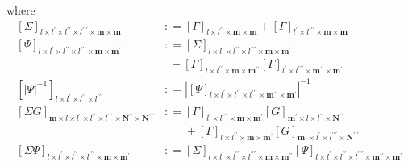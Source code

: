 \documentclass[preprint,12pt]{elsarticle}
\newcommand*{\M}[1]{\ensuremath{#1}\xspace}
\newcommand*{\x}{\times}
\newcommand*{\mi}[1]{\mathbf{#1}}
\newcommand*{\te}[2][]{\left\lbrack{#2}\right\rbrack_{#1}}
\newcommand*{\deq}{\M{\mathrel{\mathop:}=}}
\newcommand*{\modulus}[1]{\M{\left\lvert{#1}\right\rvert}}
\begin{document}
            where
            \begin{equation*}
                \begin{aligned}
                    \te[l\x l^{\prime}\x l^{\prime\prime}\x l^{\prime\prime\prime}\x\mi{m}\x\mi{m}]{\Sigma} &\deq 
                    \te[l\x l^{\prime\prime}\x\mi{m}\x\mi{m}]{\Gamma} + \te[l^{\prime}\x l^{\prime\prime\prime}\x\mi{m}\x\mi{m}]{\Gamma} \\
                    \te[l\x l^{\prime}\x l^{\prime\prime}\x l^{\prime\prime\prime}\x\mi{m}\x\mi{m^{\prime}}]{\Psi} &\deq 
                    \te[l\x l^{\prime}\x l^{\prime\prime}\x l^{\prime\prime\prime}\x\mi{m}\x\mi{m^{\prime}}]{\Sigma} \\
                    &\phantom{:}- \te[l\x l^{\prime\prime}\x\mi{m}\x\mi{m^{\prime\prime}}]{\Gamma} \te[l^{\prime}\x l^{\prime\prime\prime}\x\mi{m^{\prime\prime}}\x\mi{m^{\prime}}]{\Gamma} \\
                    \te[l\x l^{\prime}\x l^{\prime\prime}\x l^{\prime\prime\prime}]{\modulus{\Psi}^{-1}} &\deq 
                    \modulus{\te[l\x l^{\prime}\x l^{\prime\prime}\x l^{\prime\prime\prime}\x\mi{m^{\prime\prime}}\x\mi{m^{\prime}}]{\Psi}}^{-1} \\
                    \te[\mi{m}\x l\x l^{\prime}\x l^{\prime\prime}\x l^{\prime\prime\prime}\x\mi{N^{\prime\prime}}\x\mi{N^{\prime\prime\prime}}]{\Sigma G} &\deq 
                    \te[l^{\prime}\x l^{\prime\prime\prime}\x\mi{m}\x\mi{m^{\prime}}]{\Gamma}
                    \te[\mi{m^{\prime}}\x l\x l^{\prime\prime}\x\mi{N^{\prime\prime}}]{G}\\
                    &\phantom{\deq}+
                    \te[l\x l^{\prime\prime}\x\mi{m}\x\mi{m^{\prime}}]{\Gamma}
                    \te[\mi{m^{\prime}}\x l^{\prime}\x l^{\prime\prime\prime}\x\mi{N^{\prime\prime\prime}}]{G}\\
                    \te[l\x l^{\prime}\x l^{\prime\prime}\x l^{\prime\prime\prime}\x\mi{m}\x\mi{m^{\prime}}]{\Sigma\Psi} &\deq 
                    \te[l\x l^{\prime}\x l^{\prime\prime}\x l^{\prime\prime\prime}\x\mi{m}\x\mi{m^{\prime\prime}}]{\Sigma}
                    \te[l\x l^{\prime}\x l^{\prime\prime}\x l^{\prime\prime\prime}\x\mi{m^{\prime\prime}}\x\mi{m^{\prime}}]{\Psi}
                \end{aligned}                    
            \end{equation*}
\end{document}

